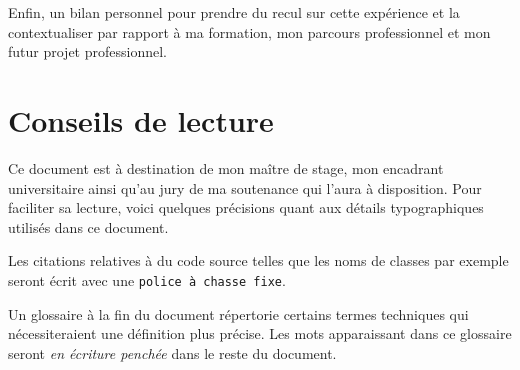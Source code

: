 Enfin, un bilan personnel pour prendre du
recul sur cette expérience et la contextualiser par rapport à ma formation, mon
parcours professionnel et mon futur projet professionnel.

\section*{Conseils de lecture}

Ce document est à destination de mon maître de stage, mon encadrant
universitaire ainsi qu'au jury de ma soutenance qui l'aura à disposition. Pour
faciliter sa lecture, voici quelques précisions quant aux détails typographiques
utilisés dans ce document.

Les citations relatives à du code source telles que les noms de classes par
exemple seront écrit avec une {\tt police à chasse fixe}.

Un glossaire à la fin du document répertorie certains termes techniques qui
nécessiteraient une définition plus précise. Les mots apparaissant dans ce
glossaire seront {\sl en écriture penchée} dans le reste du document.

